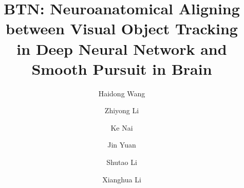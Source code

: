 \documentclass[final,3p,times,twocolumn]{elsarticle}
\begin{document}
\begin{frontmatter}



\title{BTN: Neuroanatomical Aligning between Visual Object Tracking \\in Deep Neural Network and Smooth Pursuit in Brain}

 \author[label1]{Haidong Wang}
 \author[label1]{Zhiyong Li}
 \author[label1]{Ke Nai}
 \author[label1]{Jin Yuan}
 \author[label2]{Shutao Li}
 \author[label3]{Xianghua Li}
 \address[label1]{College of Computer Science and Electronic Engineering, Hunan University, Changsha, China}
 \address[label2]{College of Electrical and Information Engineering, Hunan University, Changsha, China}
 \address[label3]{State Grid Hunan Electric Power Company Limited Economical and Technical Research Institute, Changsha, China}

%


\end{frontmatter}
\end{document}
